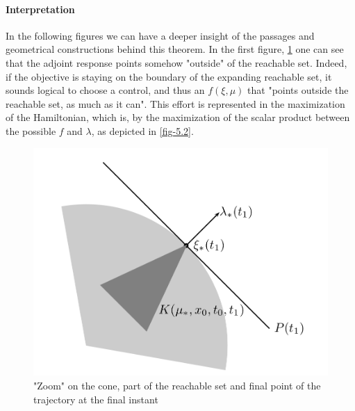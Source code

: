 \paragraph{Interpretation}
In the following figures we can have a deeper insight of the passages and geometrical constructions behind this theorem. In the first figure, \ref{fig-5.3.1} one can see that the adjoint response points somehow "outside" of the reachable set. Indeed, if the objective is staying on the boundary of the expanding reachable set, it sounds logical to choose a control, and thus an $f(\xi,\mu)$ that "points outside the reachable set, as much as it can". This effort is represented in the maximization of the Hamiltonian,  which is, by the maximization of the scalar product between the possible $f$ and $\lambda$, as depicted in \ref{fig-5.2}. %

\begin{figure}[h!]
	\includegraphics[width=0.4\linewidth]{imgs/5-3-L.png}
	\caption{"Zoom" on the cone, part of the reachable set and final point of the trajectory at the final instant}
	\label{fig-5.3.1}
\end{figure}

